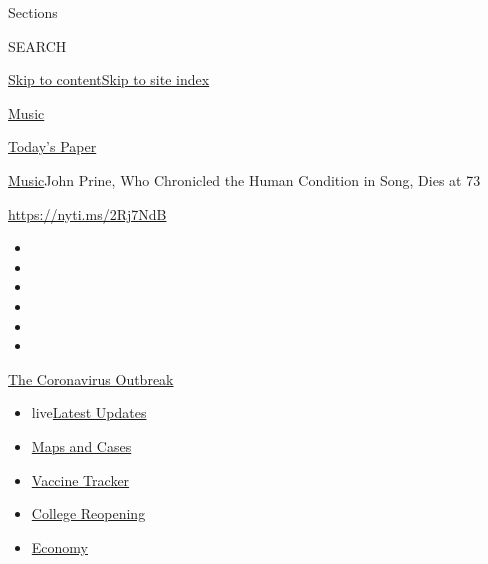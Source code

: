 Sections

SEARCH

\protect\hyperlink{site-content}{Skip to
content}\protect\hyperlink{site-index}{Skip to site index}

\href{https://www.nytimes3xbfgragh.onion/section/arts/music}{Music}

\href{https://myaccount.nytimes3xbfgragh.onion/auth/login?response_type=cookie\&client_id=vi}{}

\href{https://www.nytimes3xbfgragh.onion/section/todayspaper}{Today's
Paper}

\href{/section/arts/music}{Music}\textbar{}John Prine, Who Chronicled
the Human Condition in Song, Dies at 73

\url{https://nyti.ms/2Rj7NdB}

\begin{itemize}
\item
\item
\item
\item
\item
\item
\end{itemize}

\href{https://www.nytimes3xbfgragh.onion/news-event/coronavirus?action=click\&pgtype=Article\&state=default\&region=TOP_BANNER\&context=storylines_menu}{The
Coronavirus Outbreak}

\begin{itemize}
\tightlist
\item
  live\href{https://www.nytimes3xbfgragh.onion/2020/08/04/world/coronavirus-covid-19.html?action=click\&pgtype=Article\&state=default\&region=TOP_BANNER\&context=storylines_menu}{Latest
  Updates}
\item
  \href{https://www.nytimes3xbfgragh.onion/interactive/2020/us/coronavirus-us-cases.html?action=click\&pgtype=Article\&state=default\&region=TOP_BANNER\&context=storylines_menu}{Maps
  and Cases}
\item
  \href{https://www.nytimes3xbfgragh.onion/interactive/2020/science/coronavirus-vaccine-tracker.html?action=click\&pgtype=Article\&state=default\&region=TOP_BANNER\&context=storylines_menu}{Vaccine
  Tracker}
\item
  \href{https://www.nytimes3xbfgragh.onion/2020/08/02/us/covid-college-reopening.html?action=click\&pgtype=Article\&state=default\&region=TOP_BANNER\&context=storylines_menu}{College
  Reopening}
\item
  \href{https://www.nytimes3xbfgragh.onion/live/2020/08/03/business/stock-market-today-coronavirus?action=click\&pgtype=Article\&state=default\&region=TOP_BANNER\&context=storylines_menu}{Economy}
\end{itemize}

